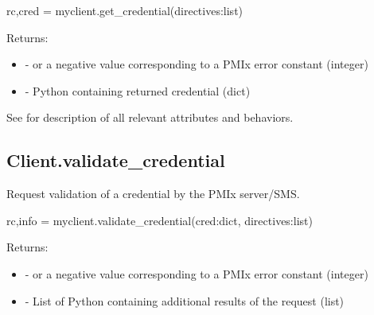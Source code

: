 \pyspecificstart
\begin{codepar}
rc,cred = myclient.get_credential(directives:list)
\end{codepar}
\pyspecificend

\begin{arglist}
\end{arglist}

Returns:

\begin{itemize}
    \item {} -  or a negative value corresponding to a PMIx error constant (integer)
    \item {} - Python  containing returned credential (dict)
\end{itemize}

See  for description of all relevant attributes and behaviors.


\subsection{Client.validate_credential}

\summary

Request validation of a credential by the PMIx server/SMS.

\format

\pyspecificstart
\begin{codepar}
rc,info = myclient.validate_credential(cred:dict, directives:list)
\end{codepar}
\pyspecificend

\begin{arglist}
\end{arglist}

Returns:

\begin{itemize}
    \item {} -  or a negative value corresponding to a PMIx error constant (integer)
    \item {} - List of Python  containing additional results of the request (list)
\end{itemize}

